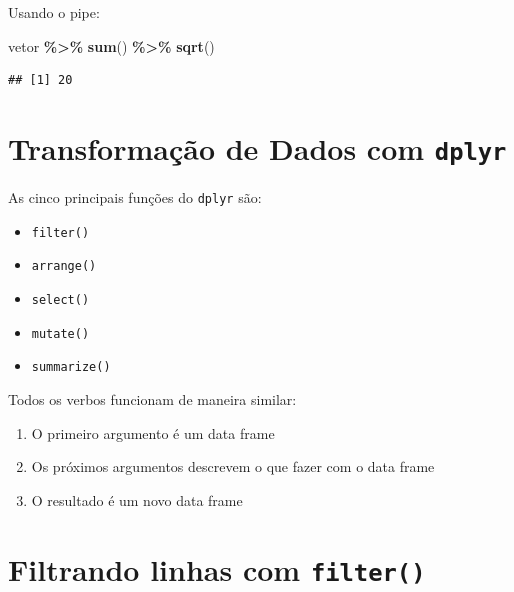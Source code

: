 \documentclass[
]{book}
\newenvironment{Shaded}{\begin{snugshade}}{\end{snugshade}}
\newcommand{\FunctionTok}[1]{\textcolor[rgb]{0.13,0.29,0.53}{\textbf{#1}}}
\newcommand{\NormalTok}[1]{#1}
\newcommand{\SpecialCharTok}[1]{\textcolor[rgb]{0.81,0.36,0.00}{\textbf{#1}}}
\providecommand{\tightlist}{%
  \setlength{\itemsep}{0pt}\setlength{\parskip}{0pt}}
\begin{document}
Usando o pipe:

\begin{Shaded}
\begin{Highlighting}[]
\NormalTok{vetor }\SpecialCharTok{\%\textgreater{}\%} \FunctionTok{sum}\NormalTok{() }\SpecialCharTok{\%\textgreater{}\%} \FunctionTok{sqrt}\NormalTok{()}
\end{Highlighting}
\end{Shaded}

\begin{verbatim}
## [1] 20
\end{verbatim}

\section{\texorpdfstring{Transformação de Dados com \texttt{dplyr}}{Transformação de Dados com dplyr}}\label{transformauxe7uxe3o-de-dados-com-dplyr}

As cinco principais funções do \texttt{dplyr} são:

\begin{itemize}
\tightlist
\item
  \texttt{filter()}
  \vspace{3mm}
\item
  \texttt{arrange()}
  \vspace{3mm}
\item
  \texttt{select()}
  \vspace{3mm}
\item
  \texttt{mutate()}
  \vspace{3mm}
\item
  \texttt{summarize()}
\end{itemize}

Todos os verbos funcionam de maneira similar:

\begin{enumerate}
\def\labelenumi{\arabic{enumi}.}
\tightlist
\item
  O primeiro argumento é um data frame
  \vspace{2mm}
\item
  Os próximos argumentos descrevem o que fazer com o data frame
  \vspace{2mm}
\item
  O resultado é um novo data frame
\end{enumerate}

\section{\texorpdfstring{Filtrando linhas com \texttt{filter()}}{Filtrando linhas com filter()}}\label{filtrando-linhas-com-filter}
\end{document}
